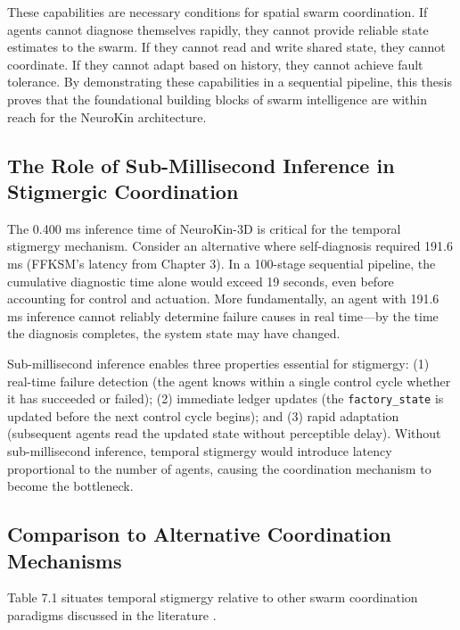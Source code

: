 ﻿\documentclass[12pt,a4paper,oneside]{report}
\begin{document}
These capabilities are necessary conditions for spatial swarm coordination. If agents cannot diagnose themselves rapidly, they cannot provide reliable state estimates to the swarm. If they cannot read and write shared state, they cannot coordinate. If they cannot adapt based on history, they cannot achieve fault tolerance. By demonstrating these capabilities in a sequential pipeline, this thesis proves that the foundational building blocks of swarm intelligence are within reach for the NeuroKin architecture.

\subsection{The Role of Sub-Millisecond Inference in Stigmergic Coordination}

The 0.400 ms inference time of NeuroKin-3D is critical for the temporal stigmergy mechanism. Consider an alternative where self-diagnosis required 191.6 ms (FFKSM's latency from Chapter 3). In a 100-stage sequential pipeline, the cumulative diagnostic time alone would exceed 19 seconds, even before accounting for control and actuation. More fundamentally, an agent with 191.6 ms inference cannot reliably determine failure causes in real time---by the time the diagnosis completes, the system state may have changed.

Sub-millisecond inference enables three properties essential for stigmergy: (1) real-time failure detection (the agent knows within a single control cycle whether it has succeeded or failed); (2) immediate ledger updates (the \texttt{factory\_state} is updated before the next control cycle begins); and (3) rapid adaptation (subsequent agents read the updated state without perceptible delay). Without sub-millisecond inference, temporal stigmergy would introduce latency proportional to the number of agents, causing the coordination mechanism to become the bottleneck.

\subsection{Comparison to Alternative Coordination Mechanisms}

Table 7.1 situates temporal stigmergy relative to other swarm coordination paradigms discussed in the literature \cite{bongard2006resilient, cully2015robots, domberg2026selfadapting}.
\end{document}
